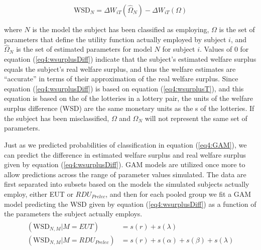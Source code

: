 \documentclass[../main.tex]{subfiles}
\begin{document}
\addtocounter{footnote}{-1}

\begin{equation}
	\label{eq4:wsurplusDiff}
	\text{WSD}_N = \Delta W_{iT}(\hat{\Omega}_N) - \Delta W_{iT}(\Omega)
\end{equation}

\noindent where $N$ is the model the subject has been classified as employing, $\Omega$ is the set of parameters that define the utility function actually employed by subject $i$, and $\hat{\Omega}_N$ is the set of estimated parameters for model $N$ for subject $i$.
Values of 0 for equation (\ref{eq4:wsurplusDiff}) indicate that the subject's estimated welfare surplus equals the subject's real welfare surplus, and thus the welfare estimates are \enquote{accurate} in terms of their approximation of the real welfare surplus.
Since equation (\ref{eq4:wsurplusDiff}) is based on equation (\ref{eq4:wsurplusT}), and this equation is based on the {\CE} of the lotteries in a lottery pair, the units of the welfare surplus difference (WSD) are the same monetary units as the {\CE}s of the lotteries.
If the subject has been misclassified, $\Omega$ and $\hat{\Omega}_N$ will not represent the same set of parameters.

Just as we predicted probabilities of classification in equation (\ref{eq4:GAM}), we can predict the difference in estimated welfare surplus and real welfare surplus given by equation (\ref{eq4:wsurplusDiff}).
GAM models are utilized once more to allow predictions across the range of parameter values simulated.
The data are first separated into subsets based on the models the simulated subjects actually employ, either EUT or $\mathit{RDU_{Prelec}}$, and then for each pooled group we fit a GAM model predicting the WSD given by equation (\ref{eq4:wsurplusDiff}) as a function of the parameters the subject actually employs.
\begin{align}
	\label{eq4:GAM_welfare}
	\begin{split}
		(\text{WSD}_{N,M} | M = EUT)                   &= s(r) + s(\lambda)\\
		(\text{WSD}_{N,M} | M = \mathit{RDU_{Prelec}}) &= s(r) + s(\alpha) + s(\beta) + s(\lambda)
	\end{split}
\end{align}
\end{document}
